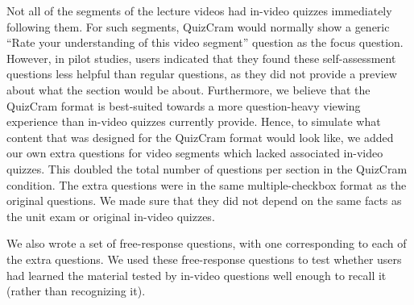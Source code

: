 \documentclass{sigchi}
\begin{document}


Not all of the segments of the lecture videos had in-video quizzes immediately following them. For such segments, QuizCram would normally show a generic ``Rate your understanding of this video segment'' question as the focus question. However, in pilot studies, users indicated that they found these self-assessment questions less helpful than regular questions, as they did not provide a preview about what the section would be about. Furthermore, we believe that the QuizCram format is best-suited towards a more question-heavy viewing experience than in-video quizzes currently provide. Hence, to simulate what content that was designed for the QuizCram format would look like, we added our own extra questions for video segments which lacked associated in-video quizzes. This doubled the total number of questions per section in the QuizCram condition. The extra questions were in the same multiple-checkbox format as the original questions. We made sure that they did not depend on the same facts as the unit exam or original in-video quizzes.


We also wrote a set of free-response questions, with one corresponding to each of the extra questions. We used these free-response questions to test whether users had learned the material tested by in-video questions well enough to recall it (rather than recognizing it).

\end{document}
